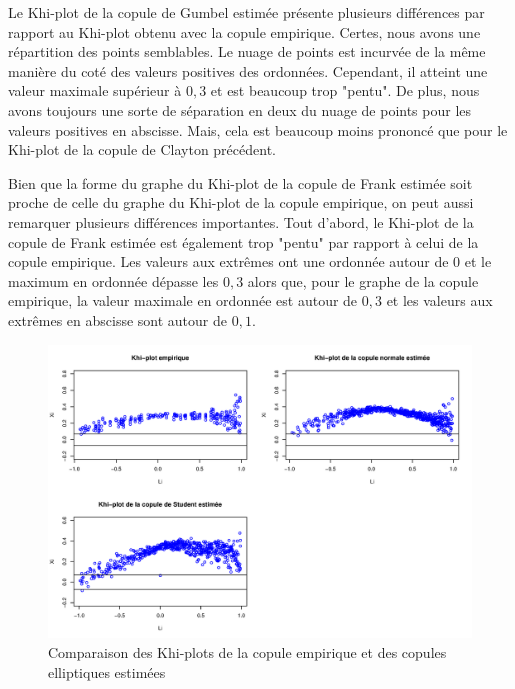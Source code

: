 Le Khi-plot de la copule de Gumbel estimée présente plusieurs différences par rapport au Khi-plot obtenu avec la copule empirique. Certes, nous avons une répartition des points semblables. Le nuage de points est incurvée de la même manière du coté des valeurs positives des ordonnées. Cependant, il atteint une valeur maximale supérieur à $0,3$ et est beaucoup trop "pentu". De plus, nous avons toujours une sorte de séparation en deux du nuage de points pour les valeurs positives en abscisse. Mais, cela est beaucoup moins prononcé que pour le Khi-plot de la copule de Clayton précédent.

Bien que la forme du graphe du Khi-plot de la copule de Frank estimée soit proche de celle du graphe du Khi-plot de la copule empirique, on peut aussi remarquer plusieurs différences importantes. Tout d'abord, le Khi-plot de la copule de Frank estimée est également trop "pentu" par rapport à celui de la copule empirique. Les valeurs aux extrêmes ont une ordonnée autour de $0$ et le maximum en ordonnée dépasse les $0,3$ alors que, pour le graphe de la copule empirique, la valeur maximale en ordonnée est autour de $0,3$ et les valeurs aux extrêmes en abscisse sont autour de $0,1$.

\noindent%
\begin{figure}[H]
    \begin{center}
      \includegraphics[width=17 cm, angle=0]{./pictures/ellipcmlkhiplot.png}
      \centering\caption{\label{2}Comparaison des Khi-plots de la copule empirique et des copules elliptiques estimées}
    \end{center}
\end{figure}

